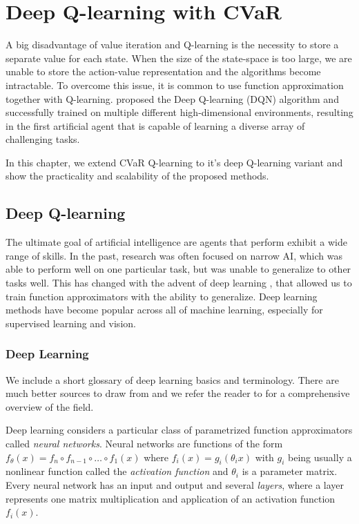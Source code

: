 \chapter{Deep Q-learning with CVaR}\label{ch:dqn}

A big disadvantage of value iteration and Q-learning is the necessity to store a separate value for each state. When the size of the state-space is too large, we are unable to store the action-value representation and the algorithms become intractable. To overcome this issue, it is common to use function approximation together with Q-learning. \citet{mnih2015human} proposed the Deep Q-learning (DQN) algorithm and successfully trained on multiple different high-dimensional environments, resulting in the first artificial agent that is capable of learning a diverse array of challenging tasks.

In this chapter, we extend CVaR Q-learning to it's deep Q-learning variant and show the practicality and scalability of the proposed methods.

\section{Deep Q-learning}
The ultimate goal of artificial intelligence are agents that perform exhibit a wide range of skills. In the past, research was often focused on narrow AI, which was able to perform well on one particular task, but was unable to generalize to other tasks well. This has changed with the advent of deep learning \citep{krizhevsky2012imagenet}, that allowed us to train function approximators with the ability to generalize. Deep learning methods have become popular across all of machine learning, especially for supervised learning and vision.

\subsection{Deep Learning}

We include a short glossary of deep learning basics and terminology. There are much better sources to draw from and we refer the reader to \citet{goodfellow2016deep} for a comprehensive overview of the field.

Deep learning considers a particular class of parametrized function approximators called \textit{neural networks}. 
Neural networks are functions of the form $f_\theta(x) = f_n \circ f_{n-1} \circ\hdots\circ  f_1(x)$ where $f_i(x) = g_i(\theta_i x)$ with $g_i$ being usually a nonlinear function called the \textit{activation function} and $\theta_i$ is a parameter matrix. Every neural network has an input and output and several \textit{layers}, where a layer represents one matrix multiplication and application of an activation function $f_i(x)$.

